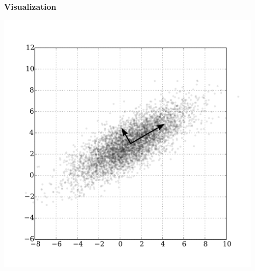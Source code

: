 \documentclass[aspectratio=169]{beamer}
\begin{document}
\begin{frame}
    \frametitle{Visualization}

    \centering
    \includegraphics[height=0.9\textheight]{1024px-GaussianScatterPCA.svg.png}
\end{frame}
\end{document}

